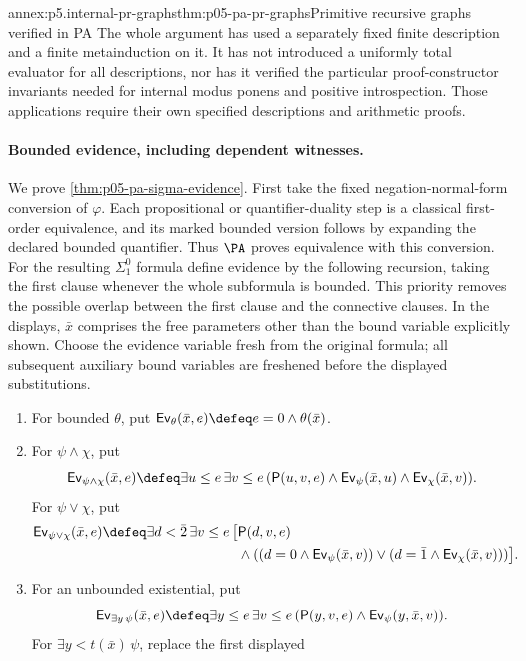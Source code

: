 \begin{annexitem}{annex:p5.internal-pr-graphs}{thm:p05-pa-pr-graphs}{Primitive recursive graphs verified in PA}
The whole argument has used a separately fixed finite description and a
finite metainduction on it.  It has not introduced a uniformly total
evaluator for all descriptions, nor has it verified the particular
proof-constructor invariants needed for internal modus ponens and positive
introspection.  Those applications require their own specified descriptions
and arithmetic proofs.

\paragraph{Bounded evidence, including dependent witnesses.}
We prove \cref{thm:p05-pa-sigma-evidence}.  First take the fixed
negation-normal-form conversion of \(\varphi\).  Each propositional or
quantifier-duality step is a classical first-order equivalence, and its
marked bounded version follows by expanding the declared bounded
quantifier.  Thus \(\PA\) proves equivalence with this conversion.
For the resulting \(\Sigma^0_1\) formula define evidence by the following
recursion, taking the first clause whenever the whole subformula is bounded.
This priority removes the possible overlap between the first clause and
the connective clauses.  In the displays, \(\bar x\) comprises the free
parameters other than the bound variable explicitly shown.
Choose the evidence variable fresh from the original formula; all subsequent
auxiliary bound variables are freshened before the displayed substitutions.
\begin{enumerate}
\item For bounded \(\theta\), put
\(\mathsf{Ev}_\theta(\bar x,e)\defeq e=0\land\theta(\bar x)\).
\item For \(\psi\land\chi\), put
\[
 \mathsf{Ev}_{\psi\land\chi}(\bar x,e)\defeq
 \exists u\leq e\,\exists v\leq e\,
 (\mathsf P(u,v,e)\land\mathsf{Ev}_\psi(\bar x,u)
                         \land\mathsf{Ev}_\chi(\bar x,v)).
\]
For \(\psi\lor\chi\), put
\[
\begin{split}
 \mathsf{Ev}_{\psi\lor\chi}(\bar x,e)\defeq
 \exists d<\bar2\,\exists v\leq e\,\bigl[
 &\mathsf P(d,v,e)\\
 &\land((d=0\land\mathsf{Ev}_\psi(\bar x,v))
       \lor(d=\bar1\land\mathsf{Ev}_\chi(\bar x,v)))\bigr].
\end{split}
\]
\item For an unbounded existential, put
\[
 \mathsf{Ev}_{\exists y\,\psi}(\bar x,e)\defeq
 \exists y\leq e\,\exists v\leq e\,
   (\mathsf P(y,v,e)\land\mathsf{Ev}_\psi(y,\bar x,v)).
\]
For \(\exists y<t(\bar x)\,\psi\), replace the first displayed

\end{enumerate}
\end{annexitem}
